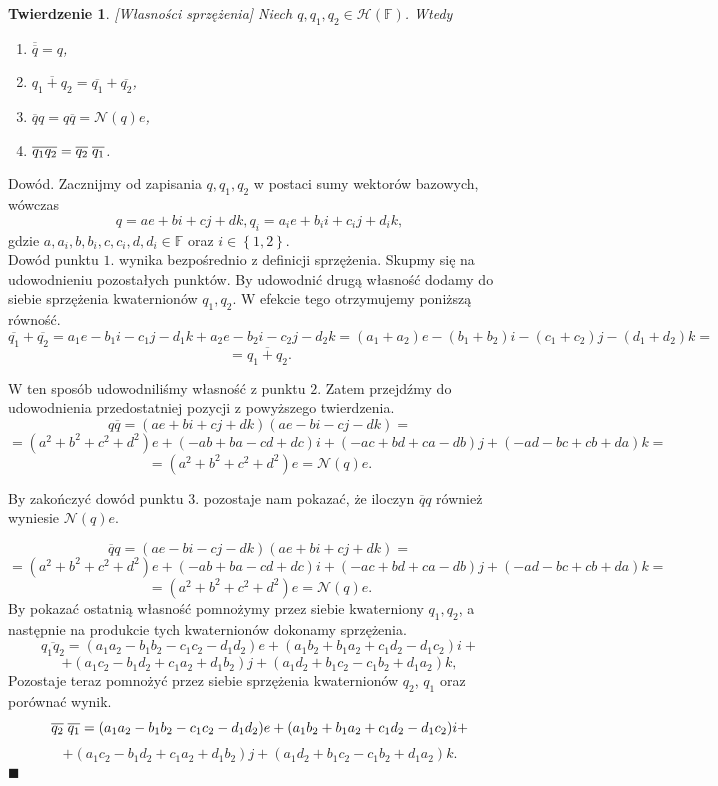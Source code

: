 \documentclass[a4paper,twoside,11pt,reqno]{mwrep}
\theoremstyle{plain} \newtheorem{twr}{Twierdzenie}
\theoremstyle{plain} \newtheorem{lem}{Lemat}
\theoremstyle{definition} \newtheorem{defi}{Definicja}
\theoremstyle{remark} \newtheorem*{wni}{Wniosek}
\theoremstyle{definition} \newtheorem{uwaga}{Uwaga}
\theoremstyle{definition}\newtheorem{prz}{Przykład}
\newenvironment{dowod}{\par\vspace{0.1cm}\par{\sc Dowód.}}{\hfill $\blacksquare$\par\vspace{0.4cm}\par}
\begin{document}
\begin{twr}\label{SprzężenieWłasności}[Własności sprzężenia]
Niech $q,q_1,q_2 \in \mathcal{H}(\mathbb{F})$. Wtedy
\begin{enumerate}
\item $\overline{\overline{q}} = q$,
\item $\overline{q_1+q_2} = \overline{q_1}+\overline{q_2}$,
\item $\overline{q}q= q\overline{q}=\mathcal{N}(q)e$,
\item $\overline{q_1q_2} = \overline{q_2} \hspace{1mm}\overline{q_1}$.
\end{enumerate}

\end{twr}


\begin{dowod}
Zacznijmy od zapisania $q,q_1,q_2$ w postaci sumy wektorów bazowych, wówczas
$$q = ae+bi+cj+dk,q_i = a_ie+b_ii+c_ij+d_ik, $$
gdzie $a,a_i,b,b_i,c,c_i,d,d_i\in \mathbb{F}$ oraz $i\in\left\{1,2\right\}$.\\
Dowód punktu $\mathit{1}.$ wynika bezpośrednio z definicji sprzężenia. Skupmy się na
udowodnieniu pozostałych punktów. By udowodnić drugą własność dodamy do siebie sprzężenia
kwaternionów $q_1,q_2$. W efekcie tego otrzymujemy poniższą równość.
$$\overline{q_1}+\overline{q_2} = a_1e-b_1i-c_1j-d_1k+a_2e-b_2i-c_2j-d_2k =
(a_1+a_2)e-(b_1+b_2)i-(c_1+c_2)j-(d_1+d_2)k =$$
$$=\overline{q_1+q_2}.$$

W ten sposób udowodniliśmy własność z punktu  $\mathit{2}.$ 
Zatem przejdźmy do udowodnienia przedostatniej pozycji z powyższego twierdzenia. 
$$q\overline{q}= (ae+bi+cj+dk)(ae-bi-cj-dk) =$$
$$= (a^2+b^2+c^2+d^2)e
+(-ab+ba-cd+dc)i+(-ac+bd+ca-db)j+(-ad-bc+cb+da)k  =$$
$$=(a^2+b^2+c^2+d^2)e = \mathcal{N}(q)e.$$

By zakończyć dowód punktu $\mathit{3}.$ pozostaje nam pokazać, że iloczyn $\overline{q}q$ również wyniesie 
$\mathcal{N}(q)e$.

$$\overline{q}q= (ae-bi-cj-dk)(ae+bi+cj+dk) =$$
$$= (a^2+b^2+c^2+d^2)e
+(-ab+ba-cd+dc)i+(-ac+bd+ca-db)j+(-ad-bc+cb+da)k  =$$
$$=(a^2+b^2+c^2+d^2)e = \mathcal{N}(q)e.$$
By pokazać ostatnią własność pomnożymy przez siebie kwaterniony $q_1,q_2$,
a następnie na produkcie tych kwaternionów dokonamy sprzężenia.
$$\overline{q_1q_2}= (a_1 a_2-b_1b_2-c_1c_2-d_1d_2)e+
(a_1b_2+b_1a_2+c_1d_2-d_1c_2)i+$$
$$+(a_1c_2-b_1d_2+c_1a_2+d_1b_2)j+(a_1d_2+b_1c_2-c_1b_2+d_1a_2)k,$$
Pozostaje teraz pomnożyć przez siebie sprzężenia kwaternionów $q_2$, $q_1$ oraz porównać wynik.
$$\overline{q_2} \hspace{1mm}\overline{q_1}= (a_1 a_2-b_1b_2-c_1c_2-d_1d_2)e+
(a_1b_2+b_1a_2+c_1d_2-d_1c_2)i+$$
$$+(a_1c_2-b_1d_2+c_1a_2+d_1b_2)j+(a_1d_2+b_1c_2-c_1b_2+d_1a_2)k.$$
\end{dowod}
\end{document}
